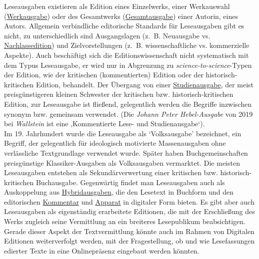 \documentclass{article}
\begin{document}
        Leseausgaben existieren als Edition eines Einzelwerks, einer Werkauswahl (\href{http://gams.uni-graz.at/o:konde.213}{Werkausgabe}) oder des Gesamtwerks (\href{http://gams.uni-graz.at/o:konde.91}{Gesamtausgabe}) einer Autorin, eines Autors. Allgemein verbindliche editorische Standards für Leseausgaben gibt es nicht, zu unterschiedlich sind Ausgangslagen (z. B. Neuausgabe vs. \href{http://gams.uni-graz.at/o:konde.140}{Nachlassedition}) und Zielvorstellungen (z. B. wissenschaftliche vs. kommerzielle Aspekte). Auch beschäftigt sich die Editionswissenschaft nicht systematisch mit dem Typus Leseausgabe, er wird nur in Abgrenzung zu \emph{science-to-science}-Typen der Edition, wie der kritischen (kommentierten) Edition oder der historisch-kritischen Edition, behandelt. Der Übergang von einer \href{http://gams.uni-graz.at/o:konde.173}{Studienausgabe}, der meist preisgünstigeren kleinen Schwester der kritischen bzw. historisch-kritischen Edition, zur Leseausgabe ist fließend, gelegentlich werden die Begriffe inzwischen synonym bzw. gemeinsam verwendet. (Die \emph{Johann Peter Hebel-Ausgabe} von 2019 bei \emph{Wallstein} ist eine ‚Kommentierte Lese- und Studienausgabe‘). \\
            
        Im 19. Jahrhundert wurde die Leseausgabe als ‘Volksausgabe’ bezeichnet, ein Begriff, der gelegentlich für ideologisch motivierte Massenausgaben ohne verlässliche Textgrundlage verwendet wurde. Später haben Buchgemeinschaften preisgünstige Klassiker-Ausgaben als Volksausgaben vermarktet. Die meisten Leseausgaben entstehen als Sekundärverwertung einer kritischen bzw. historisch-kritischen Buchausgabe. Gegenwärtig findet man Leseausgaben auch als Auskoppelung aus \href{http://gams.uni-graz.at/o:konde.96}{Hybridausgaben}, die den Lesetext in Buchform und den editorischen \href{http://gams.uni-graz.at/o:konde.34}{Kommentar} und \href{http://gams.uni-graz.at/o:konde.32}{Apparat} in digitaler Form bieten. Es gibt aber auch Leseausgaben als eigenständig erarbeitete Editionen, die mit der Erschließung des Werks zugleich seine Vermittlung an ein breiteres Lesepublikum beabsichtigen. Gerade dieser Aspekt der Textvermittlung könnte auch im Rahmen von Digitalen Editionen weiterverfolgt werden, mit der Fragestellung, ob und wie Lesefassungen edierter Texte in eine Onlinepräsenz eingebaut werden könnten.\\
            
\end{document}
